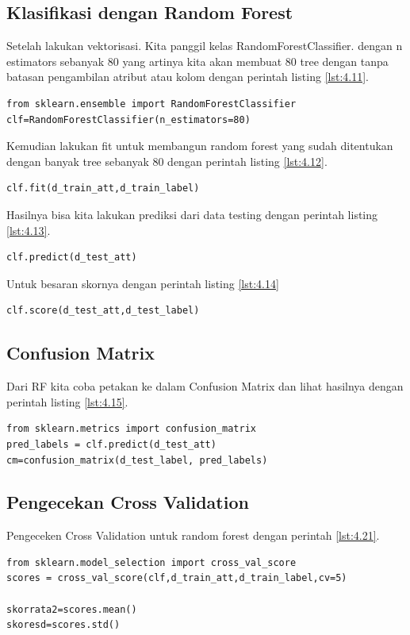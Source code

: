 \subsection{Klasifikasi dengan Random Forest}
Setelah lakukan vektorisasi. Kita panggil kelas RandomForestClassifier. dengan n estimators sebanyak 80 yang artinya kita akan membuat 80 tree dengan tanpa batasan pengambilan atribut atau kolom dengan perintah listing \ref{lst:4.11}.
\begin{lstlisting}[caption=Instansiasi kelas Random Forest,label={lst:4.11}]
from sklearn.ensemble import RandomForestClassifier
clf=RandomForestClassifier(n_estimators=80)
\end{lstlisting}


Kemudian lakukan fit untuk membangun random forest yang sudah ditentukan dengan banyak tree sebanyak 80 dengan perintah listing \ref{lst:4.12}.
\begin{lstlisting}[caption=Fitting random forest dengan dataset training,label={lst:4.12}]
clf.fit(d_train_att,d_train_label)
\end{lstlisting}


Hasilnya bisa kita lakukan prediksi dari data testing dengan perintah listing \ref{lst:4.13}.
\begin{lstlisting}[caption=Melihat Hasil prediksi,label={lst:4.13}]
clf.predict(d_test_att)
\end{lstlisting}

Untuk besaran skornya dengan perintah listing \ref{lst:4.14}
\begin{lstlisting}[caption=Score perolehan dari klasifikasi,label={lst:4.14}]
clf.score(d_test_att,d_test_label)
\end{lstlisting}

\subsection{Confusion Matrix}
Dari RF kita coba petakan ke dalam Confusion Matrix dan lihat hasilnya dengan perintah listing \ref{lst:4.15}.
\begin{lstlisting}[caption=Membuat Confusion Matrix,label={lst:4.15}]
from sklearn.metrics import confusion_matrix
pred_labels = clf.predict(d_test_att)
cm=confusion_matrix(d_test_label, pred_labels)
\end{lstlisting}



\subsection{Pengecekan Cross Validation}
Pengeceken Cross Validation untuk random forest dengan perintah \ref{lst:4.21}.
\begin{lstlisting}[caption=Hasil Cross Validation random forest,label={lst:4.21}]
from sklearn.model_selection import cross_val_score
scores = cross_val_score(clf,d_train_att,d_train_label,cv=5)

skorrata2=scores.mean()
skoresd=scores.std()
\end{lstlisting}


